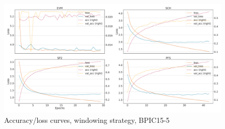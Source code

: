 \begin{figure}[!htb]
    \centering
    \includegraphics[width=\textwidth]{gfx/bpic2015_5/windowed_loss_acc_curve.pdf}
    \caption{Accuracy/loss curves, windowing strategy, BPIC15-5}
\end{figure}
\FloatBarrier
